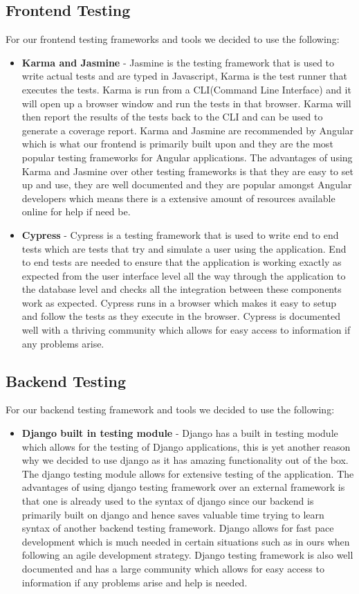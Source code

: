\documentclass[12pt]{article}
\begin{document}
\subsection{Frontend Testing}
For our frontend testing frameworks and tools we decided to use the following:
\begin{itemize}
    \item \textbf{Karma and Jasmine} - Jasmine is the testing framework that is used to write actual tests and are typed in Javascript, Karma is the test runner that executes the tests. Karma is run from a CLI(Command Line Interface) and it will open up a browser window and run the tests in that browser. Karma will then report the results of the tests back to the CLI and can be used to generate a coverage report. Karma and Jasmine are recommended by Angular which is what our frontend is primarily built upon and they are the most popular testing frameworks for Angular applications. The advantages of using Karma and Jasmine over other testing frameworks is that they are easy to set up and use, they are well documented and they are popular amongst Angular developers which means there is a extensive amount of resources available online for help if need be.
    \item \textbf{Cypress} - Cypress is a testing framework that is used to write end to end tests which are tests that try and simulate a user using the application. End to end tests are needed to ensure that the application is working exactly as expected from the user interface level all the way through the application to the database level and checks all the integration between these components work as expected. Cypress runs in a browser which makes it easy to setup and follow the tests as they execute in the browser. Cypress is documented well with a thriving community which allows for easy access to information if any problems arise.
\end{itemize}

\subsection{Backend Testing}
For our backend testing framework and tools we decided to use the following:
\begin{itemize}
    \item \textbf{Django built in testing module} - Django has a built in testing module which allows for the testing of Django applications, this is yet another reason why we decided to use django as it has amazing functionality out of the box. The django testing module allows for extensive testing of the application. The advantages of using django testing framework over an external framework is that one is already used to the syntax of django since our backend is primarily built on django and hence saves valuable time trying to learn syntax of another backend testing framework. Django allows for fast pace development which is much needed in certain situations such as in ours when following an agile development strategy. Django testing framework is also well documented and has a large community which allows for easy access to information if any problems arise and help is needed.
\end{itemize}
\end{document}
